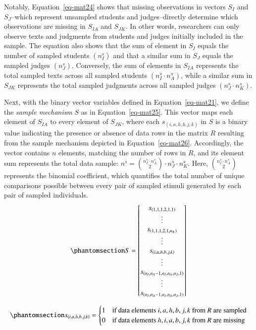 \documentclass[
  authoryear,
  review,
  1p]{elsarticle}
\begin{document}
Notably, Equation~\ref{eq-mat24} shows that missing observations in
vectors \(S_{I}\) and \(S_{J}\)--which represent unsampled students and
judges--directly determine which observations are missing in \(S_{IA}\)
and \(S_{JK}\). In other words, researchers can only observe texts and
judgments from students and judges initially included in the sample. The
equation also shows that the sum of element in \(S_{I}\) equals the
number of sampled students \((n^{s}_{I})\) and that a similar sum in
\(S_{J}\) equals the sampled judges \((n^{s}_{J})\). Conversely, the sum
of elements in \(S_{IA}\) represents the total sampled texts across all
sampled students \((n^{s}_{I} \cdot n^{s}_{A})\), while a similar sum in
\(S_{JK}\) represents the total sampled judgments across all sampled
judges \((n^{s}_{J} \cdot n^{s}_{K})\).

Next, with the binary vector variables defined in
Equation~\ref{eq-mat21}, we define the \emph{sample mechanism} \(S\) as
in Equation~\ref{eq-mat25}. This vector maps each element of \(S_{IA}\)
to every element of \(S_{JK}\), where each \(s_{(i,a,h,b,j,k)}\) in
\(S\) is a binary value indicating the presence or absence of data rows
in the matrix \(R\) resulting from the sample mechanism depicted in
Equation~\ref{eq-mat26}. Accordingly, the vector contains \(n\)
elements, matching the number of rows in \(R\), and its element sum
represents the total data sample:
\(n^{s} = \binom{n^{s}_{I} \cdot n^{s}_{A}}{2} \cdot n^{s}_{J} \cdot n^{s}_{K}\).
Here, \({n^{s}_{I} \cdot n^{s}_{A} \choose 2}\) represents the binomial
coefficient, which quantifies the total number of unique comparisons
possible between every pair of sampled stimuli generated by each pair of
sampled individuals.
\begin{equation}\protect\phantomsection\label{eq-mat25}{
S = \begin{bmatrix}
s_{(1,1,1,2,1,1)} \\
\vdots \\
s_{(1,1,1,2,1,n_{K})} \\
\vdots \\
s_{(i,a,h,b,j,k)} \\
\vdots \\
s_{(n_{I},n_{A}-1,n_{I},n_{A},n_{J},1)} \\
\vdots \\
s_{(n_{I},n_{A}-1,n_{I},n_{A},n_{J},1)}
\end{bmatrix}
}\end{equation}

\begin{equation}\protect\phantomsection\label{eq-mat26}{
s_{(i,a,h,b,j,k)} = \begin{cases} 
1 & \text{if data elements } i,a,h,b,j,k \text{ from } R \text{ are sampled} \\
0 & \text{if data elements } h,i,a,b,j,k \text{ from } R \text{ are missing}
\end{cases}
}\end{equation}
\end{document}
